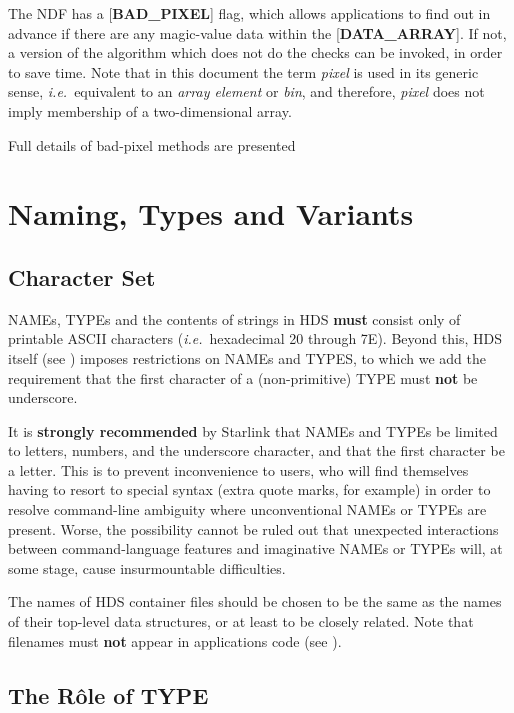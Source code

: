 \documentclass[twoside,11pt,nolof,noabs]{starlink}
\begin{document}
The NDF has a {[}\textbf{BAD\_PIXEL}{]} flag, which allows applications
to find out in advance if there are any
magic-value data within the {[}\textbf{DATA\_ARRAY}{]}.  If not, a
version of the algorithm which does not do the checks can be
invoked, in order to save time.  Note that in this document the term
\emph{pixel} is used in its generic sense, \textit{i.e.}\ equivalent to
an \emph{array element} or \emph{bin}, and therefore, \emph{pixel}
does not imply membership of a two-dimensional array.

Full details of bad-pixel methods are presented 

\section{Naming, Types and
Variants\label{se:natyvar}}

\subsection{Character Set\label{se:charset}}

NAMEs, TYPEs and the contents of strings in HDS
\textbf{must} consist only of
printable ASCII characters (\textit{i.e.}\ hexadecimal
20 through 7E).  Beyond this, HDS itself
(see ) imposes restrictions on NAMEs and TYPES,
to which we add the
requirement that the first character of a
(non-primitive) TYPE must \textbf{not} be
underscore.

It is \textbf{strongly recommended} by Starlink that NAMEs and TYPEs
be limited to letters, numbers, and the underscore character, and
that the first character be a letter.  This is to
prevent inconvenience
to users, who will find themselves having to resort
to special syntax (extra quote marks, for example) in order to
resolve
command-line ambiguity where unconventional NAMEs or TYPEs are
present.  Worse, the possibility cannot be ruled out that
unexpected interactions
between command-language features and imaginative NAMEs or TYPEs
will, at some stage, cause insurmountable difficulties.

The names of HDS container files should be chosen to be the
same as the names of their top-level data structures, or at
least to be closely related.  Note that filenames must \textbf{not}
appear in applications code (see ).

\subsection{The R\^{o}le of TYPE\label{se:roleoftype}}
\end{document}
